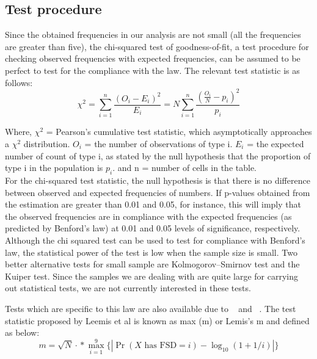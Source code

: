 \subsection{Test procedure}
Since the obtained frequencies in our analysis are not small (all the frequencies are greater than five), the chi-squared test of goodness-of-fit, a test procedure for checking observed frequencies with expected frequencies, can be assumed to be perfect to test for the compliance with the law. The relevant test statistic is as follows: \\
\begin{equation}
\chi^2=\sum_{i=1}^n {\frac{(O_i-E_i)^2}{E_i}} = N\sum_{i=1}^n \frac{(\frac{O_i}{N}-p_i)^2}{p_i}
\end{equation}

Where, $\chi^2$ = Pearson's cumulative test statistic, which asymptotically approaches a $\chi^2$ distribution.\newline
$O_i$ = the number of observations of type i.\newline
$E_i$ = the expected number of count of type i, as stated by the null hypothesis that the proportion of type i in the population is $p_i$. \newline
and n = number of cells in the table. \\

For the chi-squared test statistic, the null hypothesis is that there is no difference between observed and expected frequencies of numbers. If p-values obtained from the estimation are greater than 0.01 and 0.05, for instance, this will imply that the observed frequencies are in compliance with the expected frequencies (as predicted by Benford’s law) at 0.01 and 0.05 levels of significance, respectively. Although the chi squared test can be used to test for compliance with Benford's law, the statistical power of the test is low when the sample size is small. Two better alternative tests for small sample are Kolmogorov–Smirnov test and the Kuiper test. Since the samples we are dealing with are quite large for carrying out statistical tests, we are not currently interested in these tests. 

Tests which are specific to this law are also available due to ~\citet{leemis} and ~\citet{cho}. 
The test statistic proposed by Leemis et al is known as max (m) or Lemis’s m and defined as below: \\

\begin{equation}
m={\sqrt {N}}\cdot \operatorname {*} \max _{i=1}^{9}{\Big \{}|\Pr(X{\text{ has FSD}}=i)-\log _{10}(1+1/i)|{\Big \}}
\end{equation}

